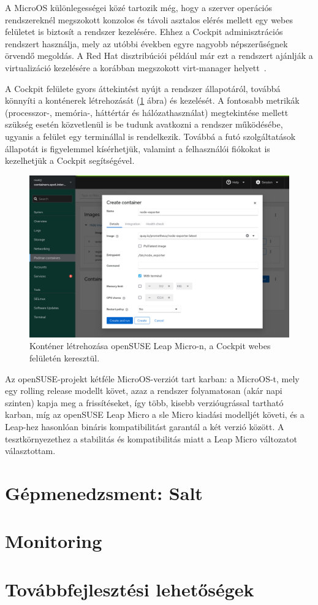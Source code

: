 A MicroOS különlegességei közé tartozik még, hogy a szerver operációs rendszereknél megszokott konzolos és távoli asztalos elérés mellett egy webes felületet is biztosít a rendszer kezelésére. Ehhez a Cockpit adminisztrációs rendszert használja, mely az utóbbi években egyre nagyobb népszerűségnek örvendő megoldás. A Red Hat disztribúciói például már ezt a rendszert ajánlják a virtualizáció kezelésére a korábban megszokott virt-manager helyett~\cite{RHELDeprecated}.

A Cockpit felülete gyors áttekintést nyújt a rendszer állapotáról, továbbá könnyíti a konténerek létrehozását (\ref{fig:cockpit-container} ábra) és kezelését. A fontosabb metrikák (processzor-, memória-, háttértár és hálózathasználat) megtekintése mellett szükség esetén közvetlenül is be tudunk avatkozni a rendszer működésébe, ugyanis a felület egy terminállal is rendelkezik. Továbbá a futó szolgáltatások állapotát is figyelemmel kísérhetjük, valamint a felhasználói fiókokat is kezelhetjük a Cockpit segítségével.

\begin{figure}[ht]
	\centering
	\includegraphics[width=15cm]{figures/cockpit.png}
	\caption{Konténer létrehozása openSUSE Leap Micro-n, a Cockpit webes felületén keresztül.}
	\label{fig:cockpit-container}
\end{figure}

Az openSUSE-projekt kétféle MicroOS-verziót tart karban: a MicroOS-t, mely egy rolling release modellt követ, azaz a rendszer folyamatosan (akár napi szinten) kapja meg a frissítéseket, így több, kisebb verzióugrással tartható karban, míg az openSUSE Leap Micro a \acrlong{sle} Micro kiadási modelljét követi, és a Leap-hez hasonlóan bináris kompatibilitást garantál a két verzió között. A tesztkörnyezethez a stabilitás és kompatibilitás miatt a Leap Micro változatot választottam.




\section{Gépmenedzsment: Salt}


\section{Monitoring}

\section{Továbbfejlesztési lehetőségek}